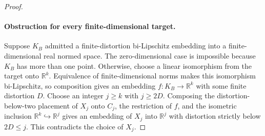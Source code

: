 \documentclass[11pt]{article}
\newcommand{\R}{\mathbb R}
\begin{document}
\begin{proof}
\paragraph{Obstruction for every finite-dimensional target.}
Suppose $K_B$ admitted a finite-distortion bi-Lipschitz embedding into a finite-dimensional real normed space. The zero-dimensional case is impossible because $K_B$ has more than one point. Otherwise, choose a linear isomorphism from the target onto $\R^k$. Equivalence of finite-dimensional norms makes this isomorphism bi-Lipschitz, so composition gives an embedding $f:K_B\to\R^k$ with some finite distortion $D$. Choose an integer $j\ge k$ with $j\ge2D$. Composing the distortion-below-two placement of $X_j$ onto $C_j$, the restriction of $f$, and the isometric inclusion $\R^k\hookrightarrow\R^j$ gives an embedding of $X_j$ into $\R^j$ with distortion strictly below $2D\le j$. This contradicts the choice of $X_j$.
\end{proof}
\end{document}
